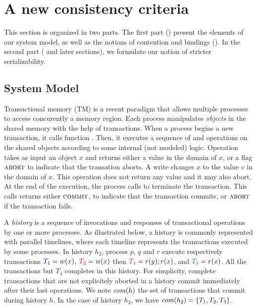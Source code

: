 \section{A new consistency criteria}

This section is organized in two parts.
The first part () present the elements of our system model, as well as the notions of contention and bindings ().
In the second part ( and later sections), we formulate our notion of stricter serializability.

\subsection{System Model}

Transactional memory (TM) is a recent paradigm that allows multiple processes to access concurently a memory region.
Each process manipulates \emph{objects} in the shared memory with the help of transactions.
When a process begins a new transaction, it calls function \stmBeginFunction.
Then, it executes a sequence of \stmReadFunction and \stmWriteFunction operations on the shared objects according to some internal (not modeled) logic.
Operation  takes as input an object $x$ and returns either a value in the domain of $x$, or a flag $\text{\textsc{abort}}$ to indicate that the transation aborts.
A write  changes $x$ to the value $v$ in the domain of $x$.
This operation does not return any value and it may also abort.
At the end of the execution, the process calls \stmTryCommitFunction to terminate the transaction.
This calls returns either $\text{\textsc{commit}}$, to indicate that the transaction commits, or $\text{\textsc{abort}}$ if the transaction fails.

A \emph{history} is a sequence of invocations and responses of transactional operations by one or more processes.
As illustrated below, a history is commonly represented with parallel timelines, where each timeline represents the transactions executed by some processes.
In history $h_2$, process $p$, $q$ and $r$ execute respectively transactions ${\color{blue}{T_1}}=w(x)$, ${\color{red}{T_2}}=w(x)$ then ${\color{Purple}{T_4}}=r(y);r(x)$, and ${\color{OliveGreen}{T_3}}=r(x)$.
All the transactions but $T_4$ completes in this history.
For simplicity, complete transactions that are not explicitely aborted in a history commit immediately after their last operations.
We note $\committed{h}$ the set of transactions that commit during history $h$.
In the case of history $h_2$, we have $\committed{h_2}=\{T_1,T_2,T_3\}$.

